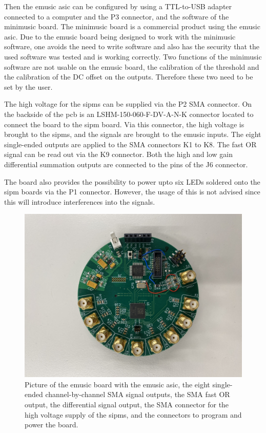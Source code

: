Then the \ac{emusic} \ac{asic} can be configured by using a TTL-to-USB adapter connected to a computer and the P3 connector, and the software of the minimusic board.
The minimusic board is a commercial product using the \ac{emusic} \ac{asic}.
Due to the \ac{emusic} board being designed to work with the minimusic software, one avoids the need to write software and also has the security that the used software was tested and is working correctly.
Two functions of the minimusic software are not usable on the \ac{emusic} board, the calibration of the threshold and the calibration of the DC offset on the outputs.
Therefore these two need to be set by the user.

The high voltage for the \acp{sipm} can be supplied via the P2 SMA connector.
On the backside of the \ac{pcb} is an LSHM-150-060-F-DV-A-N-K connector located to connect the board to the \ac{sipm} board.
Via this connector, the high voltage is brought to the \acp{sipm}, and the signals are brought to the \ac{emusic} inputs.
The eight single-ended outputs are applied to the SMA connectors K1 to K8.
The fast OR signal can be read out via the K9 connector.
Both the high and low gain differential summation outputs are connected to the pins of the J6 connector.

The board also provides the possibility to power upto six LEDs soldered onto the \ac{sipm} boards via the P1 connector.
However, the usage of this is not advised since this will introduce interferences into the signals.


\begin{figure}
	\centering
	\includegraphics[width=1.\textwidth]{pictures/emusic_board}
	\caption[eMUSIC Board]{Picture of the \ac{emusic} board with the \ac{emusic} \ac{asic}, the eight single-ended channel-by-channel SMA signal outputs, the SMA fast OR output, the differential signal output, the SMA connector for the high voltage supply of the \acp{sipm}, and the connectors to program and power the board.}
	\label{fig:emusic_board}
\end{figure}





